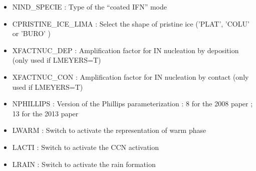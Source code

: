 \begin{itemize}
\item
{}
NIND\_SPECIE : Type of the “coated IFN” mode
\item
{}
CPRISTINE\_ICE\_LIMA : Select the shape of pristine ice ('PLAT', 'COLU' or 'BURO' )
\item
{}
XFACTNUC\_DEP : Amplification factor for IN nucleation by deposition (only used if LMEYERS=T)
\item
{}
XFACTNUC\_CON : Amplification factor for IN  nucleation by contact (only used if LMEYERS=T)
\item
{}
NPHILLIPS : Version of the Phillips parameterization : 8 for the 2008 paper ; 13 for the 2013 paper
\item
{}
LWARM : Switch to activate the representation of warm phase
\item
{}
LACTI : Switch to activate the CCN activation 
\item
{}
LRAIN : Switch to activate the rain formation


\end{itemize}
